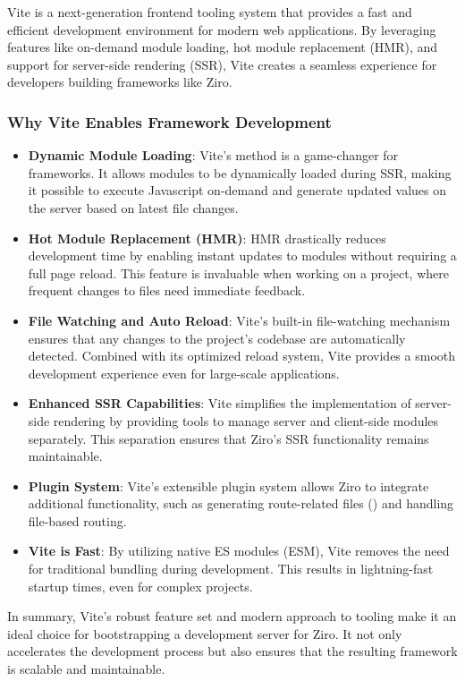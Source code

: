 Vite is a next-generation frontend tooling system that provides a fast and efficient development environment for modern web applications. By leveraging features like on-demand module loading, hot module replacement (HMR), and support for server-side rendering (SSR), Vite creates a seamless experience for developers building frameworks like Ziro.

\subsubsection*{Why Vite Enables Framework Development}
\begin{itemize}
	\item \textbf{Dynamic Module Loading}: Vite’s  method is a game-changer for frameworks. It allows modules to be dynamically loaded during SSR, making it possible to execute Javascript on-demand and generate updated values on the server based on latest file changes.
	\item \textbf{Hot Module Replacement (HMR)}: HMR drastically reduces development time by enabling instant updates to modules without requiring a full page reload. This feature is invaluable when working on a project, where frequent changes to files need immediate feedback.
	\item \textbf{File Watching and Auto Reload}: Vite’s built-in file-watching mechanism ensures that any changes to the project’s codebase are automatically detected. Combined with its optimized reload system, Vite provides a smooth development experience even for large-scale applications.
	\item \textbf{Enhanced SSR Capabilities}: Vite simplifies the implementation of server-side rendering by providing tools to manage server and client-side modules separately. This separation ensures that Ziro’s SSR functionality remains maintainable.
	\item \textbf{Plugin System}: Vite’s extensible plugin system allows Ziro to integrate additional functionality, such as generating route-related files () and handling file-based routing.
	\item \textbf{Vite is Fast}: By utilizing native ES modules (ESM), Vite removes the need for traditional bundling during development. This results in lightning-fast startup times, even for complex projects.
\end{itemize}

In summary, Vite’s robust feature set and modern approach to tooling make it an ideal choice for bootstrapping a development server for Ziro. It not only accelerates the development process but also ensures that the resulting framework is scalable and maintainable.

